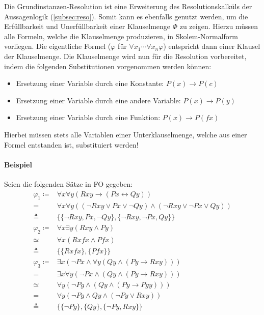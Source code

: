             Die Grundinstanzen-Resolution ist eine Erweiterung des Resolutionskalküls der Aussagenlogik (\ref{subsec:reso}). Somit kann es ebenfalls genutzt werden, um die Erfüllbarkeit und Unerfüllbarkeit einer Klauselmenge $ \Phi $ zu zeigen. Hierzu müssen alle Formeln, welche die Klauselmenge produzieren, in Skolem-Normalform vorliegen. Die eigentliche Formel ($ \varphi $ für $ \forall x _ 1 \cdots \forall x _ n \varphi $) entspricht dann einer Klausel der Klauselmenge. Die Klauselmenge wird nun für die Resolution vorbereitet, indem die folgenden Substitutionen vorgenommen werden können:
            \begin{itemize}
                \item Ersetzung einer Variable durch eine Konstante: $ P(x) \rightarrow P(c) $
                \item Ersetzung einer Variable durch eine andere Variable: $ P(x) \rightarrow P(y) $
                \item Ersetzung einer Variable durch eine Funktion: $ P(x) \rightarrow P(fx) $
            \end{itemize}
            Hierbei müssen stets alle Variablen einer Unterklauselmenge, welche aus einer Formel entstanden ist, substituiert werden!

            \paragraph{Beispiel}
                Seien die folgenden Sätze in FO gegeben:
                \begin{align*}
                    \varphi _ 1 \coloneqq& \forall x \forall y (Rxy \rightarrow (Px \leftrightarrow Qy)) \\
                                =& \forall x \forall y ((\lnot Rxy \lor Px \lor \lnot Qy) \land (\lnot Rxy \lor \lnot Px \lor Qy)) \\
                                \triangleq& \{ \{ \lnot Rxy, Px, \lnot Qy \}, \{ \lnot Rxy, \lnot Px, Qy \} \} \\
                    \varphi _ 2 \coloneqq& \forall x \exists y (Rxy \land Py) \\
                                \simeq& \forall x (Rxfx \land Pfx) \\
                                \triangleq& \{ \{ Rxfx \}, \{ Pfx \} \} \\
                    \varphi _ 3 \coloneqq& \exists x (\lnot Px \land \forall y (Qy \land (Py \rightarrow Rxy))) \\
                                =& \exists x \forall y (\lnot Px \land (Qy \land (Py \rightarrow Rxy))) \\
                                \simeq& \forall y (\lnot Pg \land (Qy \land (Py \rightarrow Pgy))) \\
                                =& \forall y (\lnot Pg \land Qy \land (\lnot Py \lor Rxy)) \\
                                \triangleq& \{ \{ \lnot Pg \}, \{ Qy \}, \{ \lnot Py, Rxy \} \} \\
                \end{align*}

